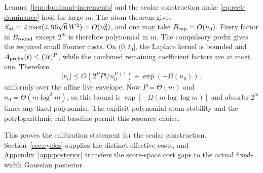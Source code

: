 Lemma~\ref{lem:dominant-increments} and the scalar construction make
\eqref{eq:rect-dominance} hold for large $m$. The atom theorem gives
$S_{\rm at}=2\max(2,96\sqrt6\,W^2)=O(n_0^2)$, and one may take
$B_{\rm cap}=O(n_0)$. Every factor in $B_{\rm round}$ except $2^m$
is therefore polynomial in $m$.
The compulsory prefix gives the required small Fourier costs. On
$(0,t_0]$, the Laplace kernel is bounded and
$A_{\rm prefix}(t)\le(2t)^P$, while the combined remaining
coefficient factors are at most one. Therefore
\[
 |\nu_v|\le O(2^P P!/n_0^{P+1})+\exp(-\Omega(n_0)),
\]
uniformly over the affine live envelope. Now $P=\Theta(m)$ and
$n_0=\Theta(m\log^2m)$, so this bound is
$\exp[-\Omega(m\log\log m)]$ and absorbs $2^m$ times any fixed
polynomial. The explicit polynomial atom stability and the
polylogarithmic rail baseline permit this resource choice.

This proves the calibration statement for the scalar construction.
Section~\ref{sec:cycles} supplies the distinct effective costs, and
Appendix~\ref{app:posterior} transfers the score-space cost gaps to
the actual fixed-width Gaussian posterior.
